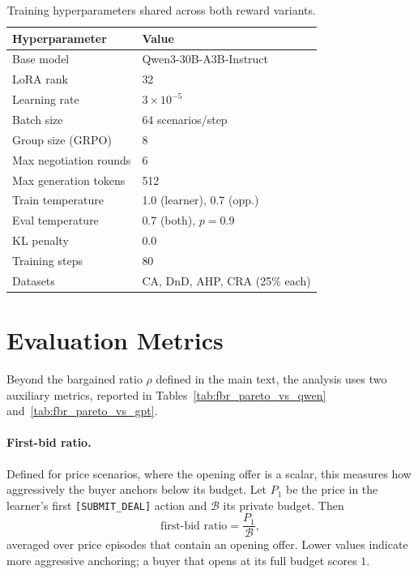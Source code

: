 \documentclass[11pt]{article}
\begin{document}
\begin{table}[ht]
\centering
\scriptsize
\renewcommand{\arraystretch}{1.15}
\begin{tabular}{ll}
\toprule
\rowcolor{tableheader}
\textbf{Hyperparameter} & \textbf{Value} \\
\midrule
\rowcolor{tablerow}
Base model & Qwen3-30B-A3B-Instruct \\
LoRA rank & 32 \\
\rowcolor{tablerow}
Learning rate & $3 \times 10^{-5}$ \\
Batch size & 64 scenarios/step \\
\rowcolor{tablerow}
Group size (GRPO) & 8 \\
Max negotiation rounds & 6 \\
\rowcolor{tablerow}
Max generation tokens & 512 \\
Train temperature & 1.0 (learner), 0.7 (opp.) \\
\rowcolor{tablerow}
Eval temperature & 0.7 (both), $p{=}0.9$ \\
KL penalty & 0.0 \\
Training steps & 80 \\
\rowcolor{tablerow}
Datasets & CA, DnD, AHP, CRA (25\% each) \\
\bottomrule
\end{tabular}
\caption{Training hyperparameters shared across both reward variants.}
\label{tab:hyperparams}
\end{table}

\section{Evaluation Metrics}
\label{app:metrics}

Beyond the bargained ratio $\rho$ defined in the main text, the analysis uses two auxiliary metrics, reported in Tables~\ref{tab:fbr_pareto_vs_qwen} and~\ref{tab:fbr_pareto_vs_gpt}.

\paragraph{First-bid ratio.} Defined for price scenarios, where the opening offer is a scalar, this measures how aggressively the buyer anchors below its budget. Let $P_1$ be the price in the learner's first \texttt{[SUBMIT\_DEAL]} action and $\mathcal{B}$ its private budget. Then
\begin{equation}
\text{first-bid ratio} = \frac{P_1}{\mathcal{B}},
\label{eq:first_bid}
\end{equation}
averaged over price episodes that contain an opening offer. Lower values indicate more aggressive anchoring; a buyer that opens at its full budget scores $1$.
\end{document}
